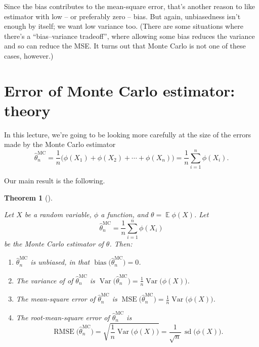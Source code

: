 \documentclass[
  letterpaper,
  DIV=11,
  numbers=noendperiod]{scrreprt}
\newcommand{\Exg}{\operatorname{\mathbb{E}}}
\theoremstyle{plain}
\newtheorem{theorem}{Theorem}[chapter]
\theoremstyle{definition}
\theoremstyle{definition}
\theoremstyle{remark}
\begin{document}
Since the bias contributes to the mean-square error, that's another
reason to like estimator with low -- or preferably zero -- bias. But
again, unbiasedness isn't enough by itself; we want low variance too.
(There are some situations where there's a ``bias--variance tradeoff'',
where allowing some bias reduces the variance and so can reduce the MSE.
It turns out that Monte Carlo is not one of these cases, however.)

\section{Error of Monte Carlo estimator:
theory}\label{error-of-monte-carlo-estimator-theory}

In this lecture, we're going to be looking more carefully at the size of
the errors made by the Monte Carlo estimator
\[ \widehat{\theta}_n^{\mathrm{MC}} = \frac{1}{n} \big(\phi(X_1) + \phi(X_2) + \cdots + \phi(X_n) \big) = \frac{1}{n} \sum_{i=1}^n \phi(X_i) . \]

Our main result is the following.

\begin{theorem}[]\protect\hypertarget{thm-MCerr}{}\label{thm-MCerr}

Let \(X\) be a random variable, \(\phi\) a function, and
\(\theta = \Exg\phi(X)\). Let
\[ \widehat{\theta}_n^{\mathrm{MC}} = \frac{1}{n} \sum_{i=1}^n \phi(X_i) \]
be the Monte Carlo estimator of \(\theta\). Then:

\begin{enumerate}
\def\labelenumi{\arabic{enumi}.}
\item
  \(\widehat{\theta}_n^{\mathrm{MC}}\) is unbiased, in that
  \(\operatorname{bias}\big(\widehat{\theta}_n^{\mathrm{MC}}\big) = 0\).
\item
  The variance of of \(\widehat{\theta}_n^{\mathrm{MC}}\) is
  \({\displaystyle \operatorname{Var}\big(\widehat{\theta}_n^{\mathrm{MC}}\big) = \frac{1}{n} \operatorname{Var}\big(\phi(X)\big)}\).
\item
  The mean-square error of \(\widehat{\theta}_n^{\mathrm{MC}}\) is
  \({\displaystyle \operatorname{MSE}\big(\widehat{\theta}_n^{\mathrm{MC}}\big) = \frac{1}{n} \operatorname{Var}\big(\phi(X)\big)}\).
\item
  The root-mean-square error of \(\widehat{\theta}_n^{\mathrm{MC}}\) is
  \[{\displaystyle \operatorname{RMSE}\big(\widehat{\theta}_n^{\mathrm{MC}}\big) = \sqrt{\frac{1}{n} \operatorname{Var}\big(\phi(X)\big)} = \frac{1}{\sqrt{n}} \, \operatorname{sd}\big(\phi(X)\big)}. \]
\end{enumerate}

\end{theorem}
\end{document}
